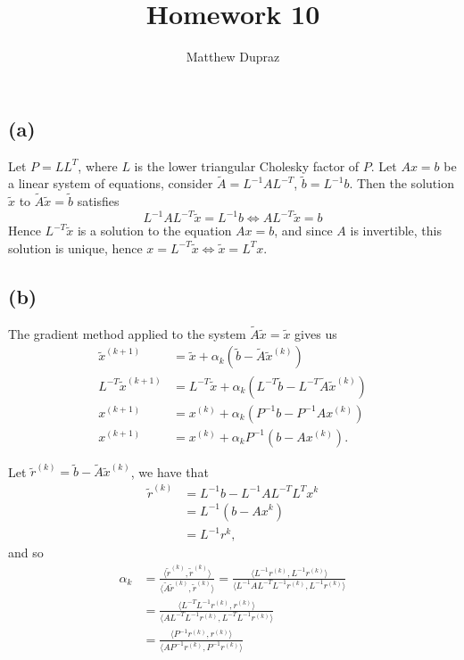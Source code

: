 \documentclass{article}
\author{Matthew Dupraz}
\title{Homework 10}
\newcommand{\wt}{\widetilde}
\newcommand{\inner}[2]{\langle #1, #2 \rangle}
\begin{document}
	
\maketitle

\subsection*{(a)}
Let $P = LL^T$, where $L$ is the lower triangular Cholesky factor
of $P$. Let $Ax = b$ be a linear system of equations, consider
$\wt{A} = L^{-1}AL^{-T}$, $\wt{b} = L^{-1}b$.
Then the solution $\wt{x}$ to $\wt{A}\wt{x} = \wt{b}$
satisfies
\begin{equation*}
	L^{-1}AL^{-T}\wt{x} = L^{-1}b \iff AL^{-T}\wt{x} = b
\end{equation*}
Hence $L^{-T}\wt{x}$ is a solution to the equation $Ax = b$, and
since $A$ is invertible, this solution is unique, hence
$x = L^{-T}\wt{x} \iff \wt{x} = L^Tx$.

\subsection*{(b)}
The gradient method applied to the system $\wt{A}\wt{x} = \wt{x}$
gives us
\begin{align*}
	\wt{x}^{(k+1)} &= \wt{x} + \alpha_k\left(\wt{b} - \wt{A}
	\wt{x}^{(k)}\right)\\
	L^{-T}\wt{x}^{(k+1)} &= L^{-T}\wt{x} + \alpha_k\left(
	L^{-T}\wt{b} - L^{-T}\wt{A} \wt{x}^{(k)}\right)\\
	x^{(k+1)} &= x^{(k)} + \alpha_k\left(
	P^{-1}b - P^{-1}Ax^{(k)}\right)\\
	x^{(k+1)} &= x^{(k)} + \alpha_kP^{-1}\left(
	b - Ax^{(k)}\right).
\end{align*}

Let $\wt{r}^{(k)} = \wt{b} - \wt{A}\wt{x}^{(k)}$, we have that
\begin{align*}
	\wt{r}^{(k)} &= L^{-1}b - L^{-1}AL^{-T}L^{T}x^{k}\\
	&= L^{-1}(b - Ax^{k})\\
	&= L^{-1}r^{k},
\end{align*}
and so
\begin{align*}
	\alpha_k &= \frac{\inner{\wt{r}^{(k)}}{\wt{r}^{(k)}}}
	{\inner{\wt{A}\wt{r}^{(k)}}{\wt{r}^{(k)}}}
	= \frac{\inner{L^{-1}r^{(k)}}{L^{-1}r^{(k)}}}
	{\inner{L^{-1}AL^{-T}L^{-1}r^{(k)}}{L^{-1}r^{(k)}}}\\
	&= \frac{\inner{L^{-T}L^{-1}r^{(k)}}{r^{(k)}}}
	{\inner{AL^{-T}L^{-1}r^{(k)}}{L^{-T}L^{-1}r^{(k)}}}\\
	&= \frac{\inner{P^{-1}r^{(k)}}{r^{(k)}}}{\inner{AP^{-1}r^{(k)}}
	{P^{-1}r^{(k)}}}
\end{align*}
\end{document}
